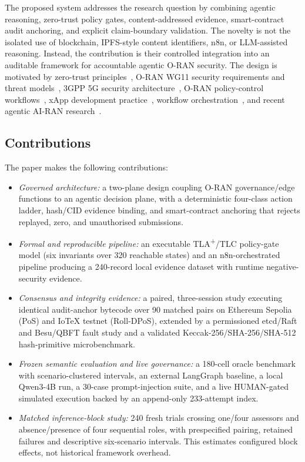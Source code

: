 \documentclass[journal]{IEEEtran}
\newif\ifshowrevisions
\newcommand{\rev}[1]{{\ifshowrevisions\color{blue}\else\color{black}\fi #1}}
\begin{document}
The proposed system addresses the research question by combining agentic
reasoning, zero-trust policy gates, content-addressed evidence, smart-contract
audit anchoring, and explicit claim-boundary validation. The novelty is not the
isolated use of blockchain, IPFS-style content identifiers, n8n, or
LLM-assisted reasoning. Instead, the contribution is their controlled
integration into an auditable framework for
accountable agentic O-RAN security. The design is motivated by zero-trust
principles~\cite{nistZeroTrust}, O-RAN WG11 security requirements and threat
models~\cite{oranSecReq,oranSecProtocols,oranThreatModel}, 3GPP 5G security
architecture~\cite{threegpp33501}, O-RAN policy-control
workflows~\cite{oranArchitecture}, xApp development practice~\cite{santos2024xapp},
workflow orchestration~\cite{n8nDocs}, and recent agentic AI-RAN
research~\cite{chatzimiltis2026,he2026agentic,elkael2025agentran,navidan2026}.
\subsection{Contributions}
The paper makes the following contributions:
\begin{itemize}[leftmargin=*]
\item \emph{Governed architecture:} a two-plane design coupling O-RAN
governance/edge functions to an agentic decision plane, with a deterministic
four-class action ladder, hash/CID evidence binding, and smart-contract
anchoring that rejects replayed, zero, and unauthorised submissions.
\item \emph{Formal and reproducible pipeline:} an executable
TLA\textsuperscript{+}/TLC policy-gate model (six invariants over 320
reachable states) and an n8n-orchestrated pipeline producing a 240-record
local evidence dataset with runtime negative-security evidence.
\item \emph{Consensus and integrity evidence:} a paired, three-session study
executing identical audit-anchor bytecode over 90 matched pairs on Ethereum
Sepolia (PoS) and IoTeX testnet (Roll-DPoS), extended by a permissioned
etcd/Raft and Besu/QBFT fault study and a validated
Keccak-256/SHA-256/SHA-512 hash-primitive microbenchmark.
\item \emph{Frozen semantic evaluation and live governance:} a 180-cell
oracle benchmark with scenario-clustered intervals, an external LangGraph
baseline, a local Qwen3-4B run, a 30-case prompt-injection suite, and a live
HUMAN-gated simulated execution backed by an append-only 233-attempt index.
\item \rev{\emph{Matched inference-block study:} 240 fresh trials crossing
one/four assessors and absence/presence of four sequential roles, with
prespecified pairing, retained failures and descriptive six-scenario
intervals. This estimates configured block effects, not historical
framework overhead.}
\end{itemize}
\end{document}
